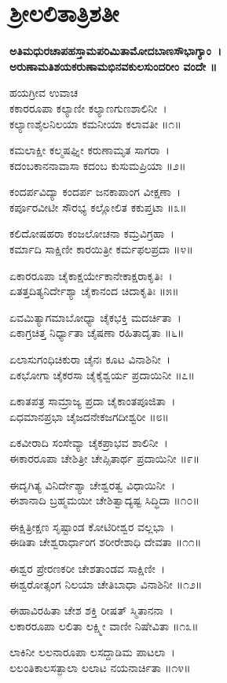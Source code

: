 \section{ಶ್ರೀಲಲಿತಾತ್ರಿಶತೀ}
{\bfseries ಅತಿಮಧುರಚಾಪಹಸ್ತಾಮಪರಿಮಿತಾಮೋದಬಾಣಸೌಭಾಗ್ಯಾಂ~।\\
ಅರುಣಾಮತಿಶಯಕರುಣಾಮಭಿನವಕುಲಸುಂದರೀಂ ವಂದೇ ॥

ಹಯಗ್ರೀವ ಉವಾಚ\\
ಕಕಾರರೂಪಾ ಕಲ್ಯಾಣೀ ಕಲ್ಯಾಣಗುಣಶಾಲಿನೀ~।\\
ಕಲ್ಯಾಣಶೈಲನಿಲಯಾ ಕಮನೀಯಾ ಕಲಾವತೀ ॥೧॥

ಕಮಲಾಕ್ಷೀ ಕಲ್ಮಷಘ್ನೀ ಕರುಣಾಮೃತ ಸಾಗರಾ~।\\
ಕದಂಬಕಾನನಾವಾಸಾ ಕದಂಬ ಕುಸುಮಪ್ರಿಯಾ ॥೨॥

ಕಂದರ್ಪವಿದ್ಯಾ ಕಂದರ್ಪ ಜನಕಾಪಾಂಗ ವೀಕ್ಷಣಾ~।\\
ಕರ್ಪೂರವೀಟೀ ಸೌರಭ್ಯ ಕಲ್ಲೋಲಿತ ಕಕುಪ್ತಟಾ ॥೩॥

ಕಲಿದೋಷಹರಾ ಕಂಜಲೋಚನಾ ಕಮ್ರವಿಗ್ರಹಾ~।\\
ಕರ್ಮಾದಿ ಸಾಕ್ಷಿಣೀ ಕಾರಯಿತ್ರೀ ಕರ್ಮಫಲಪ್ರದಾ ॥೪॥

ಏಕಾರರೂಪಾ ಚೈಕಾಕ್ಷರ್ಯೇಕಾನೇಕಾಕ್ಷರಾಕೃತಿಃ~।\\
ಏತತ್ತದಿತ್ಯನಿರ್ದೇಶ್ಯಾ ಚೈಕಾನಂದ ಚಿದಾಕೃತಿಃ ॥೫॥

ಏವಮಿತ್ಯಾಗಮಾಬೋಧ್ಯಾ ಚೈಕಭಕ್ತಿ ಮದರ್ಚಿತಾ~।\\
ಏಕಾಗ್ರಚಿತ್ತ ನಿರ್ಧ್ಯಾತಾ ಚೈಷಣಾ ರಹಿತಾದೃತಾ ॥೬॥

ಏಲಾಸುಗಂಧಿಚಿಕುರಾ ಚೈನಃ ಕೂಟ ವಿನಾಶಿನೀ~।\\
ಏಕಭೋಗಾ ಚೈಕರಸಾ ಚೈಕೈಶ್ವರ್ಯ ಪ್ರದಾಯಿನೀ ॥೭॥

ಏಕಾತಪತ್ರ ಸಾಮ್ರಾಜ್ಯ ಪ್ರದಾ ಚೈಕಾಂತಪೂಜಿತಾ~।\\
ಏಧಮಾನಪ್ರಭಾ ಚೈಜದನೇಕಜಗದೀಶ್ವರೀ ॥೮॥

ಏಕವೀರಾದಿ ಸಂಸೇವ್ಯಾ ಚೈಕಪ್ರಾಭವ ಶಾಲಿನೀ~।\\
ಈಕಾರರೂಪಾ ಚೇಶಿತ್ರೀ ಚೇಪ್ಸಿತಾರ್ಥ ಪ್ರದಾಯಿನೀ ॥೯॥

ಈದೃಗಿತ್ಯ ವಿನಿರ್ದೇಶ್ಯಾ ಚೇಶ್ವರತ್ವ ವಿಧಾಯಿನೀ~।\\
ಈಶಾನಾದಿ ಬ್ರಹ್ಮಮಯೀ ಚೇಶಿತ್ವಾದ್ಯಷ್ಟ ಸಿದ್ಧಿದಾ ॥೧೦॥

ಈಕ್ಷಿತ್ರೀಕ್ಷಣ ಸೃಷ್ಟಾಂಡ ಕೋಟಿರೀಶ್ವರ ವಲ್ಲಭಾ~।\\
ಈಡಿತಾ ಚೇಶ್ವರಾರ್ಧಾಂಗ ಶರೀರೇಶಾಧಿ ದೇವತಾ ॥೧೧॥

ಈಶ್ವರ ಪ್ರೇರಣಕರೀ ಚೇಶತಾಂಡವ ಸಾಕ್ಷಿಣೀ~।\\
ಈಶ್ವರೋತ್ಸಂಗ ನಿಲಯಾ ಚೇತಿಬಾಧಾ ವಿನಾಶಿನೀ ॥೧೨॥

ಈಹಾವಿರಹಿತಾ ಚೇಶ ಶಕ್ತಿ ರೀಷತ್ ಸ್ಮಿತಾನನಾ~।\\
ಲಕಾರರೂಪಾ ಲಲಿತಾ ಲಕ್ಷ್ಮೀ ವಾಣೀ ನಿಷೇವಿತಾ ॥೧೩॥

ಲಾಕಿನೀ ಲಲನಾರೂಪಾ ಲಸದ್ದಾಡಿಮ ಪಾಟಲಾ~।\\
ಲಲಂತಿಕಾಲಸತ್ಫಾಲಾ ಲಲಾಟ ನಯನಾರ್ಚಿತಾ ॥೧೪॥

}
